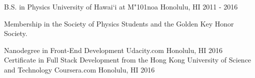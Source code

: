 \begin{cventries}
	\cventry
	{B.S. in Physics}
	{University of Hawai`i at M{\char"101}noa}
	{Honolulu, HI}
	{2011 - 2016}
	{
	  \begin{cvitems}
	    \item {Membership in the Society of Physics Students and the Golden Key Honor Society.}
	  \end{cvitems}
	}
	\cventry
	{Nanodegree in Front-End Development}
	{Udacity.com}
	{Honolulu, HI}
	{2016}
	{}  
	\cventry
	{Certificate in Full Stack Development from the Hong Kong University of Science and Technology}
	{Coursera.com}
	{Honolulu, HI}
	{2016}
	{}  
\end{cventries}
